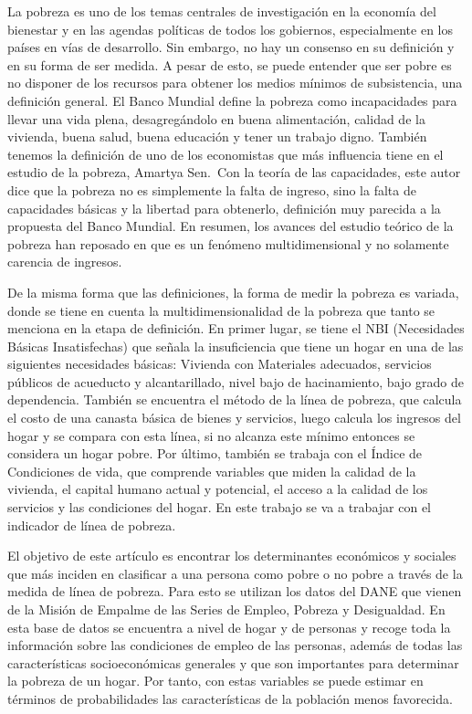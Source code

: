 \documentclass[
]{article}
\begin{document}
La pobreza es uno de los temas centrales de investigación en la economía
del bienestar y en las agendas políticas de todos los gobiernos,
especialmente en los países en vías de desarrollo. Sin embargo, no hay
un consenso en su definición y en su forma de ser medida. A pesar de
esto, se puede entender que ser pobre es no disponer de los recursos
para obtener los medios mínimos de subsistencia, una definición general.
El Banco Mundial define la pobreza como incapacidades para llevar una
vida plena, desagregándolo en buena alimentación, calidad de la
vivienda, buena salud, buena educación y tener un trabajo digno. También
tenemos la definición de uno de los economistas que más influencia tiene
en el estudio de la pobreza, Amartya Sen.~Con la teoría de las
capacidades, este autor dice que la pobreza no es simplemente la falta
de ingreso, sino la falta de capacidades básicas y la libertad para
obtenerlo, definición muy parecida a la propuesta del Banco Mundial. En
resumen, los avances del estudio teórico de la pobreza han reposado en
que es un fenómeno multidimensional y no solamente carencia de ingresos.

De la misma forma que las definiciones, la forma de medir la pobreza es
variada, donde se tiene en cuenta la multidimensionalidad de la pobreza
que tanto se menciona en la etapa de definición. En primer lugar, se
tiene el NBI (Necesidades Básicas Insatisfechas) que señala la
insuficiencia que tiene un hogar en una de las siguientes necesidades
básicas: Vivienda con Materiales adecuados, servicios públicos de
acueducto y alcantarillado, nivel bajo de hacinamiento, bajo grado de
dependencia. También se encuentra el método de la línea de pobreza, que
calcula el costo de una canasta básica de bienes y servicios, luego
calcula los ingresos del hogar y se compara con esta línea, si no
alcanza este mínimo entonces se considera un hogar pobre. Por último,
también se trabaja con el Índice de Condiciones de vida, que comprende
variables que miden la calidad de la vivienda, el capital humano actual
y potencial, el acceso a la calidad de los servicios y las condiciones
del hogar. En este trabajo se va a trabajar con el indicador de línea de
pobreza.

El objetivo de este artículo es encontrar los determinantes económicos y
sociales que más inciden en clasificar a una persona como pobre o no
pobre a través de la medida de línea de pobreza. Para esto se utilizan
los datos del DANE que vienen de la Misión de Empalme de las Series de
Empleo, Pobreza y Desigualdad. En esta base de datos se encuentra a
nivel de hogar y de personas y recoge toda la información sobre las
condiciones de empleo de las personas, además de todas las
características socioeconómicas generales y que son importantes para
determinar la pobreza de un hogar. Por tanto, con estas variables se
puede estimar en términos de probabilidades las características de la
población menos favorecida.
\end{document}
